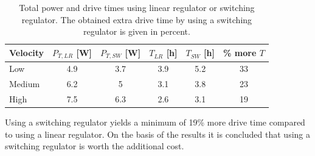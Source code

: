 \begin{table}[h]
	\centering
	\caption{Total power and drive times using linear regulator or switching regulator. The obtained extra drive time by using a switching regulator is given in percent.}
	\label{tab:drive_time}
	\begin{tabular}{|l|c|c|c|c|c|}
		\hline
		\textbf{Velocity} & $P_{T,LR}$ [W]& $P_{T,SW}$ [W]& $T_{LR}$ [h]& $T_{SW}$ [h]& \% \textbf{more} $T$ \\ \hline
		Low       	& 4.9                         & 3.7                               & 3.9              & 5.2                      & 33                 \\ \hline
		Medium  	& 6.2                         & 5                                 & 3.1              & 3.8                      & 23                 \\ \hline
		High      	& 7.5                         & 6.3                               & 2.6              & 3.1                      & 19                 \\ \hline
	\end{tabular}
\end{table}

Using a switching regulator yields a minimum of 19\% more drive time compared to using a linear regulator.
On the basis of the results it is concluded that using a switching regulator is worth the additional cost.
